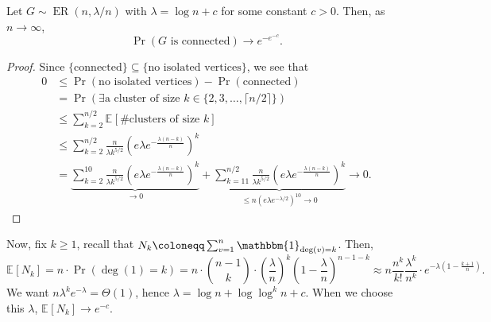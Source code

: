 \begin{theorem}
	Let \(G \sim \operatorname{ER}(n, \lambda / n)\) with \(\lambda = \log n + c\) for some constant \(c > 0\). Then, as \(n \to \infty \),
	\[
		\Pr_{}\left(G \text{ is connected} \right)
		\to e^{-e^{-c}}.
	\]
\end{theorem}
\begin{proof}
	Since \(\{ \text{connected} \} \subseteq \{ \text{no isolated vertices}  \} \), we see that
	\[
		\begin{split}
			0
			 & \leq \Pr_{}\left(\text{no isolated vertices} \right) - \Pr_{}(\text{connected} )                                                                                                                                                                                                                     \\
			 & = \Pr_{}(\exists \text{a cluster of size } k \in \{ 2, 3, \dots , \lceil n / 2 \rceil  \} )                                                                                                                                                                                                          \\
			 & \leq \sum_{k=2}^{n / 2} \mathbb{E}_{}[\text{\# clusters of size } k]                                                                                                                                                                                                                                 \\
			 & \leq \sum_{k=2}^{n / 2} \frac{n}{\lambda k^{5 / 2}} \left( e \lambda e^{-\frac{\lambda (n-k)}{n}} \right) ^k                                                                                                                                                                                         \\
			 & = \underbrace{\sum_{k=2}^{10} \frac{n}{\lambda k^{5 / 2}} \left( e \lambda e^{-\frac{\lambda (n-k)}{n}} \right) ^k}_{\to 0} + \underbrace{\sum_{k=11}^{n / 2} \frac{n}{\lambda k^{5 / 2}} \left( e \lambda e^{-\frac{\lambda (n-k)}{n}} \right) ^k}_{\leq n (e \lambda e^{-\lambda / 2})^{10} \to 0}
			\to 0.
		\end{split}
	\]
\end{proof}

\begin{prev}
	Now, fix \(k \geq 1\), recall that \(N_k \coloneqq \sum_{v=1}^{n} \mathbbm{1}_{\deg (v) = k} \). Then,
	\[
		\mathbb{E}_{}[N_k]
		= n \cdot \Pr_{}(\deg (1) = k)
		= n \cdot \binom{n-1}{k} \cdot \left( \frac{\lambda}{n} \right) ^k \left( 1 - \frac{\lambda}{n} \right) ^{n-1-k}
		\approx n \frac{n^k}{k!} \frac{\lambda ^k}{n^k} \cdot e^{-\lambda (1 - \frac{k+1}{n})}.
	\]
	We want \(n \lambda ^k e^{-\lambda } = \Theta (1)\), hence \(\lambda = \log n + \log \log^k n + c\). When we choose this \(\lambda \), \(\mathbb{E}_{}[N_k] \to e^{-c}\).
\end{prev}

